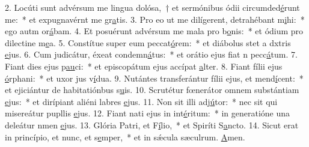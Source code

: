 2. Locúti sunt advérsum me lingua dolósa,~† et sermónibus ódii circumded\uline{é}runt me:~* et expugnavérnt me gr\uline{a}tis.
3. Pro eo ut me dilígerent, detrahébant m\uline{i}hi:~* ego autm or\uline{á}bam.
4. Et posuérunt advérsum me mala pro b\uline{o}nis:~* et ódium pro dilectine m\uline{e}a.
5. Constítue super eum peccat\uline{ó}rem:~* et diábolus stet a dxtris \uline{e}jus.
6. Cum judicátur, éxeat condemn\uline{á}tus:~* et orátio ejus fiat n pecc\uline{á}tum.
7. Fiant dies ejus p\uline{au}ci:~* et episcopátum ejus accípat \uline{a}lter.
8. Fiant fílii ejus \uline{ó}rphani:~* et uxor jus v\uline{í}dua.
9. Nutántes transferántur fílii ejus, et mend\uline{í}cent:~* et ejiciántur de habitatiónbus s\uline{u}is.
10. Scrutétur fœnerátor omnem substántiam \uline{e}jus:~* et dirípiant aliéni labres \uline{e}jus.
11. Non sit illi adj\uline{ú}tor:~* nec sit qui misereátur pupllis \uline{e}jus.
12. Fiant nati ejus in int\uline{é}ritum:~* in generatióne una deleátur nmen \uline{e}jus.
13. Glória Patri, et F\uline{í}lio,~* et Spiríti S\uline{a}ncto.
14. Sicut erat in princípio, et nunc, et s\uline{e}mper,~* et in sǽcula sæculrum. \uline{A}men.
